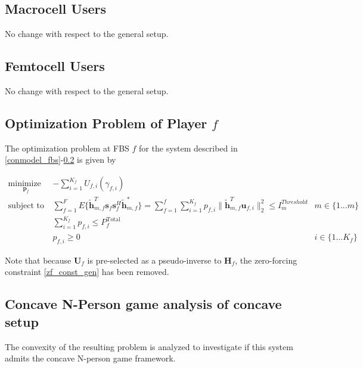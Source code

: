 \subsection{Macrocell Users}
No change with respect to the general setup.

\subsection{Femtocell Users}\label{conmodel_fuser}
No change with respect to the general setup.



\subsection{Optimization Problem of Player $f$}\label{conproblem}
The optimization problem at FBS $f$ for the system described in \ref{conmodel_fbs}-\ref{conmodel_fuser} is given by

	\begin{subequations}
	\label{optim}
	\begin{align}
	    \underset{\mathbf{p}_{f} }{\text{minimize  }} \;
	    & - \sum_{i=1}^{K_f}
    	U_{f,i}(\gamma_{f,i}) \label{player_opt_c} \\
	    \text{subject to  } \; &
	  \sum^F_{f=1} E\{ \tilde{\mathbf{h}}_{m,f}^T  \mathbf{s}_{f} 						
	\mathbf{s}_{f}^{H} \tilde{\mathbf{h}}_{m,f}^* \}
	=
	\sum_{f=1}^{f}	\sum_{i=1}^{K_f}
	 p_{f,i}\|\tilde{\mathbf{h}}_{m,f}^T \mathbf{u}_{f,i}\|^2_2
	\leq I^{Threshold}		
	_{m} & m \in \{1 ...m\} 
		\label{interference_const_c}\\
        & 
        	\sum_{i=1}^{K_{f}} p_{f,i}
	   \leq P_{f}^{\text{Total}}  \label{power_const_c}\\
        & p_{f,i} \geq 0 &  i\in \{1 ...K_{f}\} \label{pos_power_const_c}
	\end{align}
	\end{subequations}

Note that because $\mathbf{U}_{f}$ is pre-selected as a pseudo-inverse to  $\mathbf{H}_f$, the zero-forcing constraint \eqref{zf_const_gen} has been removed.

\subsection{Concave N-Person game analysis of concave setup}
The convexity of the resulting problem is analyzed to investigate if this system admits the concave N-person game framework. 

